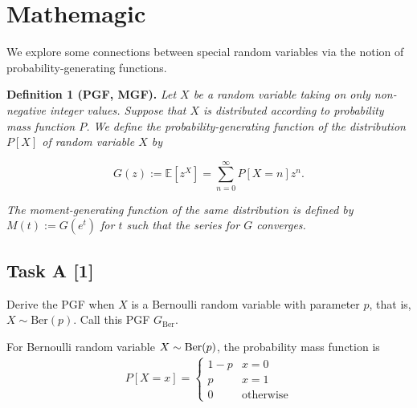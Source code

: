 \chapter{Mathemagic}

\begin{tcolorbox}[title=]
    We explore some connections between special random variables via the
    notion of probability-generating functions.
    
    \vspace{10pt}
    \begin{mdframed}[backgroundcolor=lightblue, linecolor=blue, linewidth=1.5pt]
        \textbf{Definition 1 (PGF, MGF).}
        \textit{Let $X$ be a random variable taking on only non-negative integer
        values. Suppose that $X$ is distributed according to probability mass
        function $P$. We define the probability-generating function of the
        distribution $P[X]$ of random variable $X$ by}
        
        \begin{equation*}
            G(z) := \mathbb{E}[z^X] = \sum_{n = 0}^{\infty} P[X = n] z^n.    
        \end{equation*}
        
        \textit{The \emph{moment-generating function} of the same distribution is
        defined by $M(t) := G(e^t)$ for $t$ such that the series for $G$
        converges.}
    \end{mdframed}
\end{tcolorbox}

\section*{\colS{$\S$} Task A \hfill \normalfont \large [1]}

\begin{tcolorbox}
    Derive the PGF when $X$ is a Bernoulli random variable with parameter $p$,
    that is, $X \sim \text{Ber}(p)$. Call this PGF $G_\text{Ber}$.
\end{tcolorbox}


For Bernoulli random variable $X\sim\text{Ber}(p)$, the probability mass function is
\begin{equation}
    \begin{aligned}
        P[X=x] = \begin{cases}
            1-p & x=0 \\
            p & x=1 \\
            0 & \text{otherwise}
        \end{cases}
    \end{aligned}
    \label{e1.1}
\end{equation}


